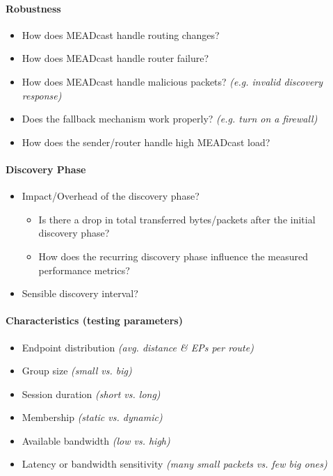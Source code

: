 \paragraph{Robustness} %
\label{par:Robustness}
\begin{itemize}
    \item How does MEADcast handle routing changes?
    \item How does MEADcast handle router failure?
    \item How does MEADcast handle malicious packets?
        \textit{(e.g. invalid discovery response)}
    \item Does the fallback mechanism work properly?
        \textit{(e.g. turn on a firewall)}
    \item How does the sender/router handle high MEADcast load?
\end{itemize}

\paragraph{Discovery Phase} %
\label{par:Discovery Phase}
\begin{itemize}
    \item Impact/Overhead of the discovery phase?
    \begin{itemize}
        \item Is there a drop in total transferred bytes/packets after the
            initial discovery phase?
        \item How does the recurring discovery phase influence the measured
            performance metrics?
    \end{itemize}
    \item Sensible discovery interval?
\end{itemize}

\paragraph{Characteristics (testing parameters)} %
\label{par:Characteristics}
\begin{itemize}
    \item Endpoint distribution \textit{(avg. distance \& EPs per route)}
    \item Group size \textit{(small vs. big)}
    \item Session duration \textit{(short vs. long)}
    \item Membership \textit{(static vs. dynamic)}
    \item Available bandwidth \textit{(low vs. high)}
    \item Latency or bandwidth sensitivity
        \textit{(many small packets vs. few big ones)}
\end{itemize}


